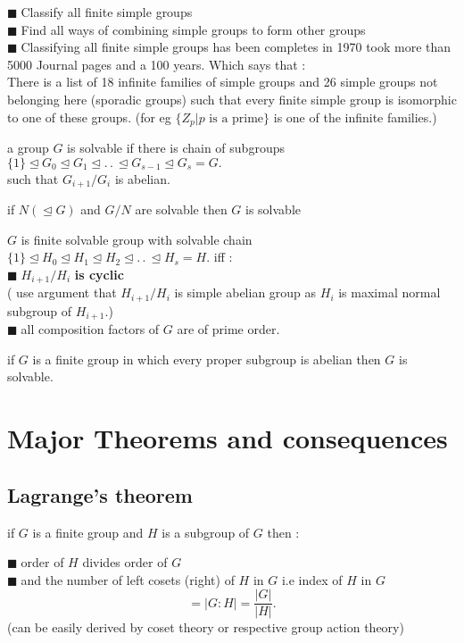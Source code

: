 \documentclass[11pt]{extarticle}
\newcommand{\w}[1]{\text{#1}}
\newcommand{\ck}{.\,.\,}
\newcommand{\snote}[1]{{\footnotesize(#1)}}
\newcommand{\y}{$\blacksquare\;$}
\newcommand{\tbx}[2][]{
	\begin{tcolorbox}[enhanced,breakable,size=small,colback=black!2!white,title={#1},arc is angular, arc=1.5mm,drop fuzzy shadow]
		#2
	\end{tcolorbox}
}
\begin{document}
\begin{multicols}{2}
{		
			\y  Classify all finite simple groups \\
			\y   Find all ways of combining simple groups to form other groups \\
			\y  Classifying all finite simple groups  has been completes in 1970 took more than 5000 Journal pages and a 100 years. Which says that : \\ 
			There is a list of 18 infinite families of simple groups and 26 simple groups not belonging here (sporadic groups)
			such that every finite simple group is isomorphic to  	one of these groups. (for eg $ \{Z_p|p \w{ is a prime}\} $ is one of the infinite families.)
		
	}
	
	
	\tbx[\textbf{Solvable Groups} ]{a group $ G $ is solvable if there is chain of subgroups \\
		$ \{1\} \trianglelefteq G_0\trianglelefteq G_1\trianglelefteq \ck \trianglelefteq G_{s-1}\trianglelefteq G_s =G.$ \\
		such that $ G_{i+1}/G_i $ is abelian.
	}
	\tbx{if $ N(\trianglelefteq G )$ and $ G/N $ are solvable then $ G $ is solvable  
	}
	\tbx{$G $ is finite solvable group with solvable chain 
		$ \{1\} \trianglelefteq H_0\trianglelefteq H_1\trianglelefteq H_{2} \trianglelefteq \ck \trianglelefteq H_s =H.$  iff : \\
		\y  $ H_{i+1}/H_i $ \textbf{is cyclic} 
		\\ \snote{ use argument that $ H_{i+1}/H_{i} $ is simple abelian group as $  
				H_{i}$ is maximal normal subgroup of $ H_{i+1} $.}\\
		\y   all composition factors of $ G $ are of prime order. 
	}
	\tbx{if $ G $ is a finite group in which every proper subgroup is abelian then $ G $ is solvable.}
	\newcolumn
	
	\section{Major Theorems and consequences}
	\subsection{Lagrange's theorem}
	\tbx[Theorem]{if $ G $ is a finite group and $ H $ is a subgroup of $ G $ 
		then :
		
			\y  order of $ H $ divides order of $ G $ \\
			\y   and the number of left cosets (right) of $ H $ in $ G $ i.e index of $ H $ in $ G $  
		\[=|G:H|= \frac{ |G|}{ |H| } .\]
			(can be easily derived by coset theory or respective group action theory)
		
}
\end{multicols}
\end{document}
